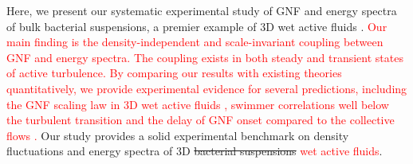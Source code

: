 \documentclass[twocolumn,aps,prx,amsmath,amssymb,longbibliography,superscriptaddress]{revtex4-2}
\begin{document}
Here, we present our systematic experimental study of GNF and energy spectra of bulk bacterial suspensions, a premier example of 3D wet active fluids \cite{Marchetti2013}.
\textcolor{red}{Our main finding is the density-independent and scale-invariant coupling between GNF and energy spectra. The coupling exists in both steady and transient states of active turbulence. By comparing our results with existing theories quantitatively, we provide experimental evidence for several predictions, including the GNF scaling law in 3D wet active fluids \cite{AditiSimha2002}, swimmer correlations well below the turbulent transition \cite{Stenhammar2017,Nambiar2021} and the delay of GNF onset compared to the collective flows \cite{Saintillan2008a, Saintillan2008b}.} Our study provides a solid experimental benchmark on density fluctuations and energy spectra of 3D \sout{bacterial suspensions} \textcolor{red}{wet active fluids}.

\end{document}

